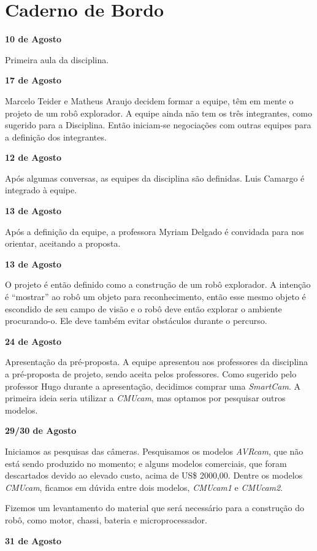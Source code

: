 \chapter{Caderno de Bordo}

\textbf{10 de Agosto}

Primeira aula da disciplina. 

\textbf{17 de Agosto}

Marcelo Teider e Matheus Araujo decidem formar a equipe, têm em mente o projeto de um robô explorador. A equipe ainda não tem os três integrantes, como sugerido para a Disciplina. Então iniciam-se negociações com outras equipes para a definição dos integrantes.

\textbf{12 de Agosto}


Após algumas conversas, as equipes da disciplina são definidas. Luis Camargo é integrado à equipe. 

\textbf{13 de Agosto}

Após a definição da equipe, a professora Myriam Delgado é convidada para nos orientar, aceitando a proposta. 

\textbf{13 de Agosto}

O projeto é então definido como a construção de um robô explorador. A intenção é “mostrar” ao robô um objeto para reconhecimento, então esse mesmo objeto é escondido de seu campo de visão e o robô deve então explorar o ambiente procurando-o. Ele deve também evitar obstáculos durante o percurso.

\textbf{24 de Agosto}

Apresentação da pré-proposta. A equipe apresentou aos professores da disciplina a pré-proposta de projeto, sendo aceita pelos professores. Como sugerido pelo professor Hugo durante a apresentação, decidimos comprar uma \textit{SmartCam}. A primeira ideia seria utilizar a \textit{CMUcam}, mas optamos por pesquisar outros modelos. 

\textbf{29/30 de Agosto}

Iniciamos as pesquisas das câmeras. Pesquisamos os modelos \textit{AVRcam}, que não está sendo produzido no momento; e alguns modelos comerciais, que foram descartados devido ao elevado custo, acima de US\$ 2000,00. Dentre os modelos \textit{CMUcam}, ficamos em dúvida entre dois modelos, \textit{CMUcam1 }e \textit{CMUcam2}. 

Fizemos um levantamento do material que será necessário para a construção do robô, como motor, chassi, bateria e microprocessador. 

\textbf{31 de Agosto}

